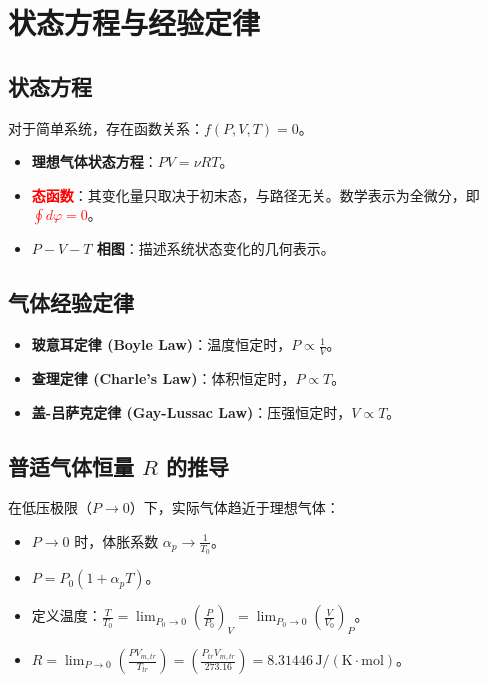 \documentclass{article}
\begin{document}
\section{状态方程与经验定律}

\subsection{状态方程}
对于简单系统，存在函数关系：$f(P, V, T) = 0$。
\begin{itemize}
    \item \textbf{理想气体状态方程}：$PV = \nu RT$。
    \item \textcolor{red}{\textbf{态函数}}：其变化量只取决于初末态，与路径无关。数学表示为全微分，即 \textcolor{red}{$\oint d\varphi = 0$}。
    \item \textbf{$P-V-T$ 相图}：描述系统状态变化的几何表示。
\end{itemize}

\subsection{气体经验定律}
\begin{itemize}
    \item \textbf{玻意耳定律 (Boyle Law)}：温度恒定时，$P \propto \frac{1}{V}$。
    \item \textbf{查理定律 (Charle's Law)}：体积恒定时，$P \propto T$。
    \item \textbf{盖-吕萨克定律 (Gay-Lussac Law)}：压强恒定时，$V \propto T$。
\end{itemize}

\subsection{普适气体恒量 $R$ 的推导}
在低压极限（$P \to 0$）下，实际气体趋近于理想气体：
\begin{itemize}
    \item $P \to 0$ 时，体胀系数 $\alpha_p \to \frac{1}{T_0}$。
    \item $P = P_0(1 + \alpha_p T)$。
    \item 定义温度：$\frac{T}{T_0} = \lim_{P_0 \to 0} \left( \frac{P}{P_0} \right)_V = \lim_{P_0 \to 0} \left( \frac{V}{V_0} \right)_P$。
    \item $R = \lim_{P \to 0} \left( \frac{P V_{m,tr}}{T_{tr}} \right) = \left( \frac{P_{tr} V_{m,tr}}{273.16} \right) = 8.31446 \, \text{J}/(\text{K}\cdot\text{mol})$。
\end{itemize}
\end{document}
